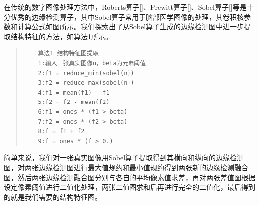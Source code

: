 \documentclass[letterpaper]{article} %
\begin{document}
在传统的数字图像处理方法中，Roberts算子[]、Prewitt算子[]、Sobel算子[]等是十分优秀的边缘检测算子，其中Sobel算子常用于脑部医学图像的处理，其卷积核参数和计算公式如图所示。我们探索出了从Sobel算子生成的边缘检测图中进一步提取结构特征的方法，如算法1所示。
\begin{quote}
	\begin{scriptsize}\begin{verbatim}
	算法1 结构特征图提取
	1:输入一张真实图像n，beta为元素阈值
	2:f1 = reduce_min(sobel(n))
	3:f2 = reduce_max(sobel(n))
	4:f1 = mean(f1) - f1
	5:f2 = f2 - mean(f2)
	6:f1 = ones * (f1 > beta)
	7:f2 = ones * (f2 > beta)
	8:f = f1 + f2
	9:f = ones * (f > 0.)
	\end{verbatim}\end{scriptsize}
\end{quote}
简单来说，我们对一张真实图像用Sobel算子提取得到其横向和纵向的边缘检测图，对两张边缘检测图进行最大值规约和最小值规约得到两张新的边缘检测融合图，然后两张边缘检测融合图分别与各自的平均像素值求差，再对两张差值图根据设定像素阈值进行二值化处理，两张二值图求和后再进行完全的二值化，最后得到的就是我们需要的结构特征图。
\end{document}

